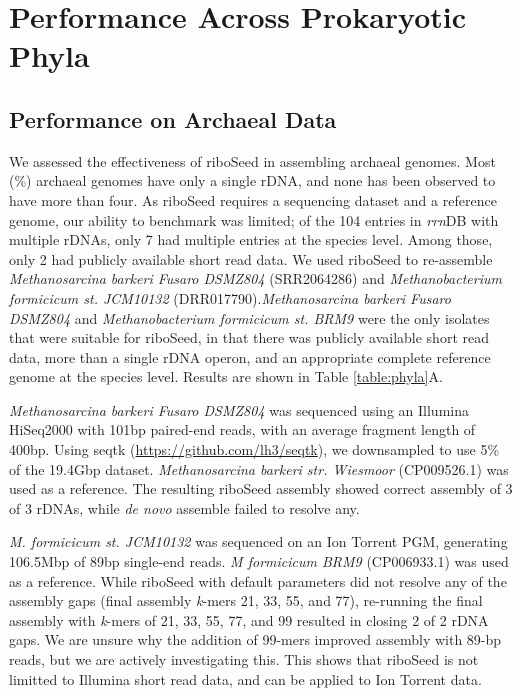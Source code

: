 \section*{Performance Across Prokaryotic Phyla}
\subsection*{Performance on Archaeal Data}

We assessed the effectiveness of riboSeed in assembling archaeal genomes. Most (\%) archaeal genomes have only a single rDNA, and none has been observed to have more than four. As riboSeed requires a sequencing dataset and a reference genome, our ability to benchmark was limited; of the 104 entries in \textit{rrn}DB with multiple rDNAs, only 7 had multiple entries at the species level. Among those, only 2 had publicly available short read data. We used riboSeed to re-assemble \textit{Methanosarcina barkeri Fusaro DSMZ804} (SRR2064286) and \textit{Methanobacterium formicicum st. JCM10132} (DRR017790).\textit{Methanosarcina barkeri Fusaro DSMZ804} and  \textit{Methanobacterium formicicum st. BRM9}  were the only isolates that were suitable for riboSeed, in that there was publicly available short read data, more than a single rDNA operon, and an appropriate complete reference genome at the species level.  Results are shown in Table \ref{table:phyla}A.

\textit{Methanosarcina barkeri Fusaro DSMZ804} was sequenced using an Illumina HiSeq2000 with 101bp paired-end reads, with an average fragment length of 400bp. Using seqtk (\href{https://github.com/lh3/seqtk}{https://github.com/lh3/seqtk}), we downsampled to use 5\% of the 19.4Gbp dataset. \textit{Methanosarcina barkeri str. Wiesmoor} (CP009526.1) was used as a reference. The resulting riboSeed assembly showed correct assembly of 3 of 3 rDNAs, while \textit{de novo} assemble failed to resolve any.

\textit{M. formicicum st. JCM10132} was sequenced on an Ion Torrent PGM, generating 106.5Mbp of 89bp single-end reads. \textit{M formicicum BRM9} (CP006933.1) was used as a reference. While riboSeed with default parameters did not resolve any of the assembly gaps (final assembly \textit{k}-mers 21, 33, 55, and 77), re-running the final assembly with \textit{k}-mers of 21, 33, 55, 77, and 99 resulted in closing 2 of 2 rDNA gaps. We are unsure why the addition of 99-mers improved assembly with 89-bp reads, but we are actively investigating this. This shows that riboSeed is not limitted to Illumina short read data, and can be applied to Ion Torrent data.

